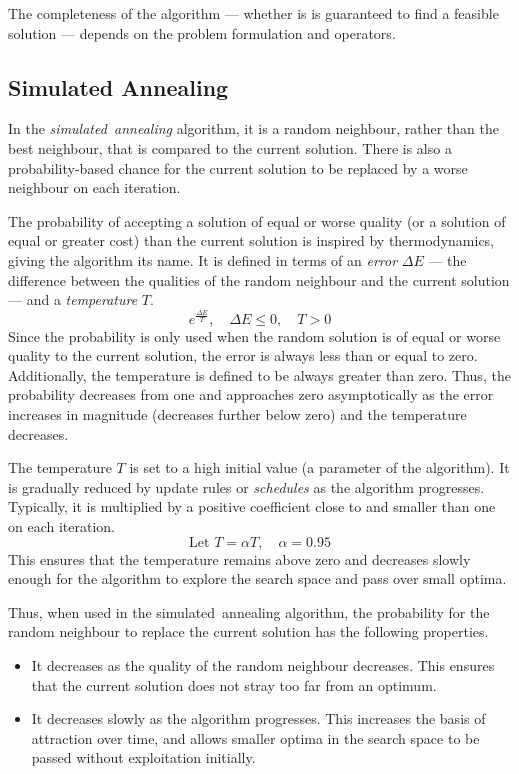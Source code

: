 The completeness of the algorithm --- whether is is guaranteed to find a feasible solution --- depends on the problem formulation and operators.

\subsection{Simulated Annealing}

In the \emph{simulated~annealing} algorithm, it is a random neighbour, rather than the best neighbour, that is compared to the current solution.
There is also a probability-based chance for the current solution to be replaced by a worse neighbour on each iteration.

The probability of accepting a solution of equal or worse quality (or a solution of equal or greater cost) than the current solution is inspired by thermodynamics, giving the algorithm its name.
It is defined in terms of an \emph{error} \( \Delta E \) --- the difference between the qualities of the random neighbour and the current solution --- and a \emph{temperature} \( T \).
\begin{equation*}
  e^{\frac{\Delta E}{T}}, \quad \Delta E \leq 0, \quad T > 0
\end{equation*}
Since the probability is only used when the random solution is of equal or worse quality to the current solution, the error is always less than or equal to zero.
Additionally, the temperature is defined to be always greater than zero.
Thus, the probability decreases from one and approaches zero asymptotically as the error increases in magnitude (decreases further below zero) and the temperature decreases.

The temperature \( T \) is set to a high initial value (a parameter of the algorithm).
It is gradually reduced by update rules or \emph{schedules} as the algorithm progresses.
Typically, it is multiplied by a positive coefficient close to and smaller than one on each iteration.
\begin{equation*}
  \text{Let } T = \alpha T, \quad \alpha = 0.95
\end{equation*}
This ensures that the temperature remains above zero and decreases slowly enough for the algorithm to explore the search space and pass over small optima.

Thus, when used in the simulated~annealing algorithm, the probability for the random neighbour to replace the current solution has the following properties.
\begin{itemize}
  \item It decreases as the quality of the random neighbour decreases.
  This ensures that the current solution does not stray too far from an optimum.
  \item It decreases slowly as the algorithm progresses.
  This increases the basis of attraction over time, and allows smaller optima in the search space to be passed without exploitation initially.
\end{itemize}

